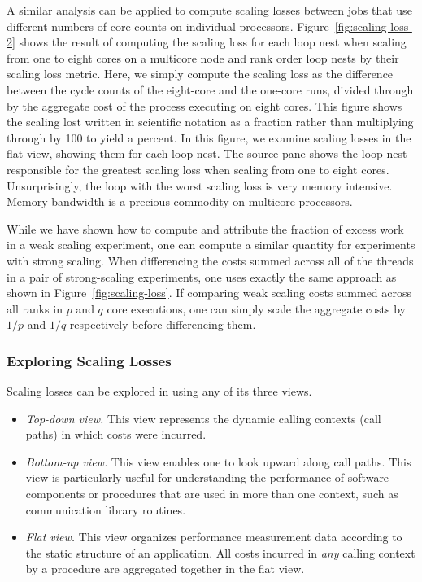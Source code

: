 \documentclass[11pt,letterpaper]{report}
\begin{document}
A similar analysis can be applied to compute scaling losses between jobs that use different numbers of core counts on individual processors.
 Figure~\ref{fig:scaling-loss-2} shows the result of computing  the scaling loss for each loop nest when scaling from one to eight cores on a multicore node and rank order loop nests by their scaling loss metric. Here, we simply compute the scaling loss as the difference between the cycle counts of the eight-core and the one-core runs, divided through by the aggregate cost of the process executing on eight cores. This figure shows the scaling lost written in scientific notation as a fraction rather than multiplying through by 100 to yield a percent.
In this figure, we examine scaling losses in the flat view, showing them for each loop nest.
The source pane shows the loop nest responsible for the greatest scaling loss when scaling from one to eight cores.
Unsurprisingly, the loop with the worst scaling loss is very memory intensive.
Memory bandwidth is a precious commodity on multicore processors.

While we have shown how to compute and attribute the fraction of excess work in a weak scaling experiment, one can compute a similar quantity for experiments with strong scaling. When differencing the costs summed across all of the threads in a pair of strong-scaling experiments, one uses exactly the same approach as shown in Figure~\ref{fig:scaling-loss}. If comparing weak scaling costs summed across all ranks in $p$ and $q$ core executions, one can simply scale the aggregate costs by $1/p$ and $1/q$ respectively before differencing them. 


\subsubsection{Exploring Scaling Losses}

Scaling losses can be explored in \hpcviewer{} using any of its three views.

\begin{itemize}
\item {\em Top-down view.} This view represents the dynamic calling contexts (call paths) in which costs were incurred. 

\item {\em Bottom-up view.} This view enables one to look upward along call paths. This view is particularly useful for understanding the performance of software components or procedures that are used in more than one context, such as communication library routines.

\item {\em Flat view.} This view organizes performance measurement data according to the static structure of an application. All costs incurred in {\em any} calling context by a procedure are aggregated together in the flat view. 
\end{itemize}
\end{document}
